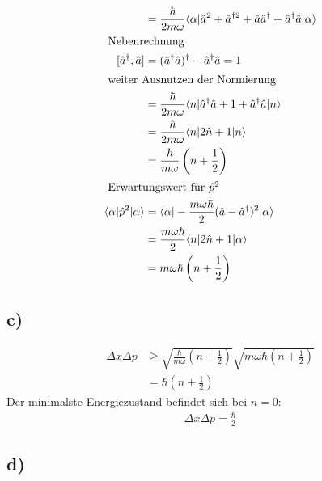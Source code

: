 \begin{align*}
        &= \frac{\hbar}{2m \omega} \langle\alpha\rvert \hat a ^2 + \hat a ^{\dagger 2} + \hat a \hat a ^\dagger + \hat a ^\dagger \hat a \lvert\alpha\rangle\\
        \intertext{
            Nebenrechnung
        }
        [\hat a ^\dagger , \hat a]&= (\hat a ^\dagger \hat a)^\dagger - \hat a ^\dagger \hat a =1\\
        \intertext{
            weiter Ausnutzen der Normierung
        }
        &=\frac{\hbar}{2m \omega} \langle n\rvert \hat a ^\dagger \hat a +1 + \hat a ^\dagger \hat a \lvert n\rangle\\
        &=\frac{\hbar}{2m \omega} \langle n\rvert 2 \hat n +1 \lvert n\rangle\\
        &=\frac{\hbar}{m \omega} \left(n+\frac{1}{2} \right)\\
        \intertext{
            Erwartungswert für $\hat p ^2$
        }
        \langle\alpha\rvert \hat p ^2 \lvert\alpha\rangle &= \langle\alpha\rvert \-- \frac{m \omega \hbar}{2} (\hat a - \hat a ^\dagger)^2 \lvert\alpha\rangle\\
        &= \frac{m \omega \hbar}{2} \langle n\rvert 2 \hat n +1 \lvert\alpha\rangle\\
        &=m \omega \hbar \left(n + \frac{1}{2} \right)
    \end{align*}

\subsection{c)}

\begin{align}
    \Delta x \Delta p &\geq \sqrt{\frac{\hbar}{m \omega}\left(n + \frac{1}{2} \right) } \sqrt{m \omega \hbar \left(n + \frac{1}{2} \right) }\\
    &= \hbar \left(n + \frac{1}{2} \right)
\end{align}
Der minimalste Energiezustand befindet sich bei $n=0$:
\begin{align}
    \Delta x \Delta p = \frac{\hbar}{2}
\end{align}


\subsection{d)}

